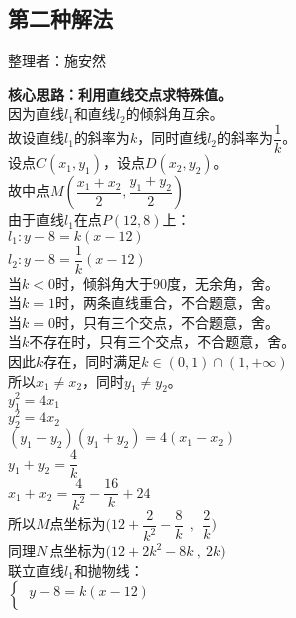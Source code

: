 \documentclass[UTF8]{ctexart}
\begin{document}
\subsection{第二种解法}
    \begin{center}
        整理者：施安然
    \end{center}
    \begin{multicols}{2}
        \small
        \textbf{核心思路：利用直线交点求特殊值。}\\[5mm]
        因为直线$l_1$和直线$l_2$的倾斜角互余。\\[5mm]
        故设直线$l_1$的斜率为$k$，同时直线$l_2$的斜率为$\dfrac{1}{k}$。\\[5mm]
        设点$C(x_1,y_1)$，设点$D(x_2,y_2)$。\\[5mm]
        故中点$M(\dfrac{x_1+x_2}{2},\dfrac{y_1+y_2}{2})$\\[5mm]
        由于直线$l_1$在点$P(12,8)$上：\\[5mm]
        $l_1:y-8=k(x-12)$\\[5mm]
        $l_2:y-8=\dfrac{1}{k}(x-12)$\\[5mm]
        当$k<0$时，倾斜角大于$90$度，无余角，舍。\\[5mm]
        当$k=1$时，两条直线重合，不合题意，舍。\\[5mm]
        当$k=0$时，只有三个交点，不合题意，舍。\\[5mm]
        当$k$不存在时，只有三个交点，不合题意，舍。\\[5mm]
        因此$k$存在，同时满足$k\in(0,1)\cap(1,+\infty)$\\[5mm]
        所以$x_1\neq x_2$，同时$y_1 \neq y_2$。\\[5mm]
        $y_1^2 = 4x_1$\\[5mm]
        $y_2^2 = 4x_2$\\[5mm]
        $(y_1 - y_2)(y_1 + y_2) = 4(x_1 - x_2)$\\[5mm]
        $y_1+y_2=\dfrac{4}{k}$\\[5mm]
        $x_1+x_2=\dfrac{4}{k^2}-\dfrac{16}{k}+24$\\[5mm]
        所以$M$点坐标为$\Big(12+\dfrac{2}{k^2}-\dfrac{8}{k}~~,~~\dfrac{2}{k}\Big)$\\[5mm]
        同理$N\,$点坐标为$\Big(12+2k^2-8k~,~2k\Big)$\\[5mm]
        联立直线$l_1$和抛物线：\\[3mm]
        \begin{math}
            \begin{cases}
                ~y-8=k(x-12)\\[1mm]

\end{cases}
\end{math}
\end{multicols}
\end{document}
